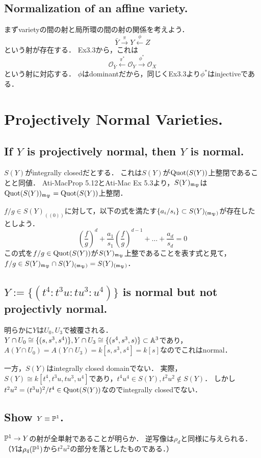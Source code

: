 \documentclass[a4paper]{jsarticle}
\begin{document}
    \subsection{Normalization of an affine variety.}
    まずvarietyの間の射と局所環の間の射の関係を考えよう．
    \[ \bar{Y} \xrightarrow{\pi} Y \xleftarrow{\phi} Z \]という射が存在する．
    Ex3.3から，これは
    \[ \mathcal{O}_{\bar{Y}} \xleftarrow{\pi^{\ast}} \mathcal{O}_{Y} \xrightarrow{\phi^{\ast}} \mathcal{O}_{X} \]
    という射に対応する．
    $\phi$はdominantだから，同じくEx3.3より$\phi^{\ast}$はinjectiveである．

\section{Projectively Normal Varieties.} 
    \subsection{If $Y$ is projectively normal, then $Y$ is normal.}
    $S(Y)$がintegrally closedだとする．
    これは$S(Y)$が$\operatorname{Quot}(S(Y))$上整閉であることと同値．
    Ati-MacProp 5.12とAti-Mac Ex 5.3より，$S(Y)_{\mathfrak{m_P}}$は$\operatorname{Quot}(S(Y))_{\mathfrak{m_P}}=\operatorname{Quot}(S(Y))$上整閉．
    
    $f/g \in S(Y)_{((0))}$に対して，以下の式を満たす$\{a_i/s_i\} \subset S(Y)_{(\mathfrak{m_P})}$が存在したとしよう．
    \[ \left( \frac{f}{g} \right)^{d}+\frac{a_1}{s_1} \left( \frac{f}{g} \right)^{d-1}+\dots+\frac{a_d}{s_d}=0 \]
    この式を$f/g \in \operatorname{Quot}(S(Y))$が$S(Y)_{\mathfrak{m_P}}$上整であることを表す式と見て，
    $f/g \in S(Y)_{\mathfrak{m_P}} \cap S(Y)_{(\mathfrak{m_P})}=S(Y)_{(\mathfrak{m_P})}$．

   \subsection{$Y:=\{(t^4:t^3 u:tu^3:u^4)\}$ is normal but not projectivly normal.}
    明らかに$Y$は$U_0, U_3$で被覆される．
    $Y \cap U_0 \cong \{(s,s^3,s^4)\}, Y \cap U_3 \cong \{(s^4,s^3,s)\} \subset \mathbb{A}^3$であり，
    $A(Y \cap U_0)=A(Y \cap U_3)=k[s,s^3,s^4]=k[s]$なのでこれはnormal．

    一方，$S(Y)$はintegrally closed domainでない．
    実際，$S(Y) \cong k[t^4,t^3 u,tu^3,u^4]$であり，$t^4 u^4 \in S(Y), t^2 u^2 \not \in S(Y)$．
    しかし$t^2 u^2=(t^3 u)^2/t^4 \in \operatorname{Quot}(S(Y))$なのでintegrally closedでない．

   \subsection{Show $Y \equiv \mathbb{P}^1$. }
   $\mathbb{P}^1 \to Y$の射が全単射であることが明らか．
   逆写像は$\rho_d$と同様に与えられる．
   （$Y$は$\rho_4(\mathbb{P}^1)$から$t^2u^2$の部分を落としたものである．）
\end{document}
